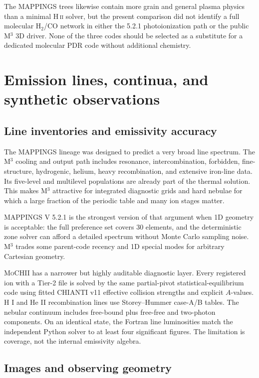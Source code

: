 \documentclass[english,a4paper]{my_memo}
\newcommand{\MoCHII}{\textsc{MoCHII}}
\newcommand{\Mthree}{M$^3$}
\newcommand{\Mappings}{MAPPINGS V 5.2.1}
\begin{document}
The MAPPINGS trees likewise contain more grain and general plasma physics
than a minimal H\,\textsc{ii} solver, but the present comparison did not
identify a full molecular H$_2$/CO network in either the 5.2.1
photoionization path or the public \Mthree{} 3D driver.  None of the three
codes should be selected as a substitute for a dedicated molecular PDR
code without additional chemistry.

\section{Emission lines, continua, and synthetic observations}

\subsection{Line inventories and emissivity accuracy}

The MAPPINGS lineage was designed to predict a very broad line spectrum.
The \Mthree{} cooling and output path includes resonance,
intercombination, forbidden, fine-structure, hydrogenic, helium, heavy
recombination, and extensive iron-line data.  Its five-level and
multilevel populations are already part of the thermal solution.  This
makes \Mthree{} attractive for integrated diagnostic grids and hard
nebulae for which a large fraction of the periodic table and many ion
stages matter.

\Mappings{} is the strongest version of that argument when 1D geometry is
acceptable: the full preference set covers 30 elements, and the
deterministic zone solver can afford a detailed spectrum without Monte
Carlo sampling noise.  \Mthree{} trades some parent-code recency and 1D
special modes for arbitrary Cartesian geometry.

\MoCHII{} has a narrower but highly auditable diagnostic layer.  Every
registered ion with a Tier-2 file is solved by the same partial-pivot
statistical-equilibrium code using fitted CHIANTI v11 effective collision
strengths and explicit $A$-values.  H I and He II recombination lines use
Storey--Hummer case-A/B tables.  The nebular continuum includes free-bound
plus free-free and two-photon components.  On an identical state, the
Fortran line luminosities match the independent Python solver to at least
four significant figures.  The limitation is coverage, not the internal
emissivity algebra.

\subsection{Images and observing geometry}
\end{document}
